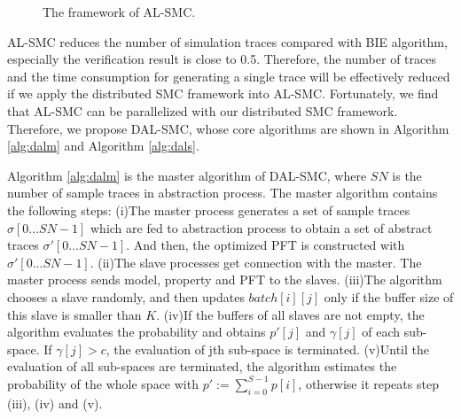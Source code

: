 \begin{figure}[htbp]
	\caption{The framework of AL-SMC.}\label{al-smc}
\end{figure}

AL-SMC reduces the number of simulation traces compared with BIE algorithm, especially the verification result is close to 0.5. Therefore, the number of traces and the time consumption for generating a single trace will be effectively reduced if we apply the distributed SMC framework into AL-SMC. Fortunately, we find that AL-SMC can be  parallelized with our distributed SMC framework. Therefore, we propose DAL-SMC, whose core algorithms are shown in Algorithm \ref{alg:dalm} and Algorithm \ref{alg:dals}.

Algorithm \ref{alg:dalm} is the master algorithm of DAL-SMC, where $SN$ is the number of sample traces in abstraction process. The master algorithm contains the following steps: (i)The master process generates a set of sample traces $\sigma[0...SN-1]$ which are fed to abstraction process to obtain a set of abstract traces $\sigma'[0...SN-1]$. And then, the optimized PFT is constructed with $\sigma'[0...SN-1]$. (ii)The slave processes get connection with the master. The master process sends model, property and PFT to the slaves. (iii)The algorithm chooses a slave randomly, and then updates $batch[i][j]$ only if the buffer size of this slave is smaller than $K$. (iv)If the buffers of all slaves are not empty, the algorithm evaluates the probability and obtains $p'[j]$ and $\gamma[j]$ of each sub-space. If $\gamma[j] > c$, the evaluation of jth sub-space is terminated. (v)Until the evaluation of all sub-spaces are terminated, the algorithm estimates the probability of the whole space with $p' := \sum\limits_{i=0}^{S-1} p[i]$, otherwise it repeats step (iii), (iv) and (v).

